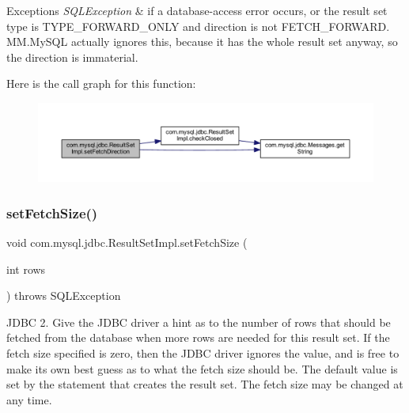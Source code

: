 \begin{DoxyExceptions}{Exceptions}
{\em S\+Q\+L\+Exception} & if a database-\/access error occurs, or the result set type is T\+Y\+P\+E\+\_\+\+F\+O\+R\+W\+A\+R\+D\+\_\+\+O\+N\+LY and direction is not F\+E\+T\+C\+H\+\_\+\+F\+O\+R\+W\+A\+RD. M\+M.\+My\+S\+QL actually ignores this, because it has the whole result set anyway, so the direction is immaterial. \\
\hline
\end{DoxyExceptions}
Here is the call graph for this function\+:
\nopagebreak
\begin{figure}[H]
\begin{center}
\leavevmode
\includegraphics[width=350pt]{classcom_1_1mysql_1_1jdbc_1_1_result_set_impl_a4bbd51f442eae410996aca75a318e54a_cgraph}
\end{center}
\end{figure}
\mbox{\label{classcom_1_1mysql_1_1jdbc_1_1_result_set_impl_a3d7a3b48520675c00358f995af291fbe}} 
\subsubsection{\texorpdfstring{set\+Fetch\+Size()}{setFetchSize()}}
{\footnotesize\ttfamily void com.\+mysql.\+jdbc.\+Result\+Set\+Impl.\+set\+Fetch\+Size (\begin{DoxyParamCaption}\item[{int}]{rows }\end{DoxyParamCaption}) throws S\+Q\+L\+Exception}

J\+D\+BC 2. Give the J\+D\+BC driver a hint as to the number of rows that should be fetched from the database when more rows are needed for this result set. If the fetch size specified is zero, then the J\+D\+BC driver ignores the value, and is free to make its own best guess as to what the fetch size should be. The default value is set by the statement that creates the result set. The fetch size may be changed at any time.


